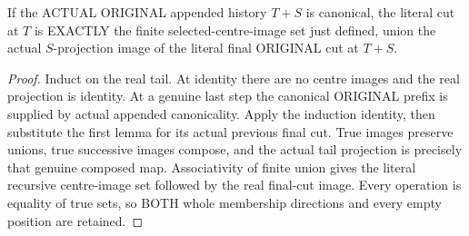 \begin{theorem}
\label{hir:original-finite-full-cut-selected-centre-image-dictionary}
\leanok
If the ACTUAL ORIGINAL appended history $T+S$ is canonical, the literal cut
at $T$ is EXACTLY the finite selected-centre-image set just defined, union
the actual $S$-projection image of the literal final ORIGINAL cut at $T+S$.
\end{theorem}
\begin{proof}
Induct on the real tail. At identity there are no centre images and the
real projection is identity. At a genuine last step the canonical ORIGINAL
prefix is supplied by actual appended canonicality. Apply the induction
identity, then substitute the first lemma for its actual previous final
cut. True images preserve unions, true successive images compose, and the
actual tail projection is precisely that genuine composed map. Associativity
of finite union gives the literal recursive centre-image set followed by
the real final-cut image. Every operation is equality of true sets, so BOTH
whole membership directions and every empty position are retained.
\end{proof}


